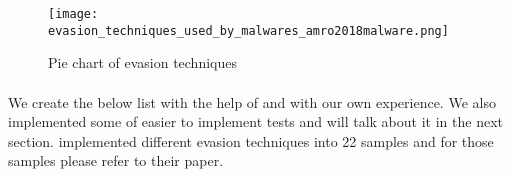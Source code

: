 \documentclass[../main.tex]{subfile}
\begin{document}
	\begin{figure}
		\texttt{[image: evasion\_techniques\_used\_by\_malwares\_amro2018malware.png]}
		\caption{Pie chart of evasion techniques \cite{amro2018malware}}
		\label{fig:pie_evasion}			
	\end{figure}
	
	
	\paragraph{} We create the below list with the help of \cite{vidas2014evading} \cite{sophos_anti_emulation} and with our own experience. We also implemented some of easier to implement tests and will talk about it in the next section. \cite{ares} implemented different evasion techniques into 22 samples and for those samples please refer to their paper.
		
\end{document}
